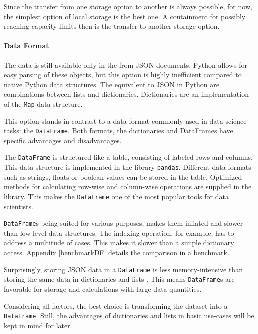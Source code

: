     	Since the transfer from one storage option to another is always possible, for now, the simplest option of local storage is the best one. A containment for possibly reaching capacity limits then is the transfer to another storage option.
        
        \paragraph{Data Format}
        The data is still available only in the from \ac{JSON} documents. Python allows for easy parsing of these objects, but this option is highly inefficient compared to native Python data structures.
        The equivalent to \ac{JSON} in Python are combinations between lists and dictionaries. Dictionaries are an implementation of the \lstinline|Map| data structure.
        
        This option stands in contrast to a data format commonly used in data science tasks: the \lstinline|DataFrame|. Both formats, the dictionaries and DataFrames have specific advantages and disadvantages.
        
        The \lstinline|DataFrame| is structured like a table, consisting of labeled rows and columns. This data structure is implemented in the library \lstinline|pandas|. 
        Different data formats such as strings, floats or boolean values can be stored in the table.        Optimized methods for calculating row-wise and column-wise operations are supplied in the library. This makes the \lstinline|DataFrame| one of the most popular tools for data scientists.
        
       \lstinline|DataFrame|s being suited for various purposes, makes them inflated and slower than low-level data structures. The indexing operation, for example, has to address a multitude of cases. This makes it slower than a simple dictionary access. Appendix \ref{benchmarkDF} details the comparison in a benchmark.
       
       Surprisingly, storing \ac{JSON} data in a \lstinline|DataFrame| is less memory-intensive than storing the same data in dictionaries and lists \cite{DFvsJSON}. This means  \lstinline|DataFrame|s are favorable for storage and calculations with large data quantities.
       
       Considering all factors, the best choice is transforming the dataset into a  \lstinline|DataFrame|. Still, the advantages of dictionaries and lists in basic use-cases will be kept in mind for later.
     
